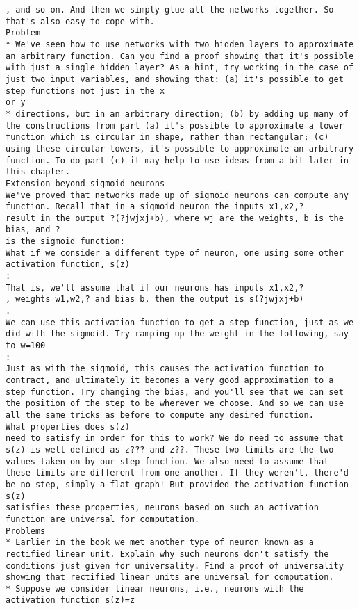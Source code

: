 \begin{lstlisting}
, and so on. And then we simply glue all the networks together. So that's also easy to cope with.
Problem
* We've seen how to use networks with two hidden layers to approximate an arbitrary function. Can you find a proof showing that it's possible with just a single hidden layer? As a hint, try working in the case of just two input variables, and showing that: (a) it's possible to get step functions not just in the x
or y
* directions, but in an arbitrary direction; (b) by adding up many of the constructions from part (a) it's possible to approximate a tower function which is circular in shape, rather than rectangular; (c) using these circular towers, it's possible to approximate an arbitrary function. To do part (c) it may help to use ideas from a bit later in this chapter.
Extension beyond sigmoid neurons
We've proved that networks made up of sigmoid neurons can compute any function. Recall that in a sigmoid neuron the inputs x1,x2,?
result in the output ?(?jwjxj+b), where wj are the weights, b is the bias, and ?
is the sigmoid function:
What if we consider a different type of neuron, one using some other activation function, s(z)
:
That is, we'll assume that if our neurons has inputs x1,x2,?
, weights w1,w2,? and bias b, then the output is s(?jwjxj+b)
.
We can use this activation function to get a step function, just as we did with the sigmoid. Try ramping up the weight in the following, say to w=100
:
Just as with the sigmoid, this causes the activation function to contract, and ultimately it becomes a very good approximation to a step function. Try changing the bias, and you'll see that we can set the position of the step to be wherever we choose. And so we can use all the same tricks as before to compute any desired function.
What properties does s(z)
need to satisfy in order for this to work? We do need to assume that s(z) is well-defined as z??? and z??. These two limits are the two values taken on by our step function. We also need to assume that these limits are different from one another. If they weren't, there'd be no step, simply a flat graph! But provided the activation function s(z)
satisfies these properties, neurons based on such an activation function are universal for computation.
Problems
* Earlier in the book we met another type of neuron known as a rectified linear unit. Explain why such neurons don't satisfy the conditions just given for universality. Find a proof of universality showing that rectified linear units are universal for computation.
* Suppose we consider linear neurons, i.e., neurons with the activation function s(z)=z

\end{lstlisting}
